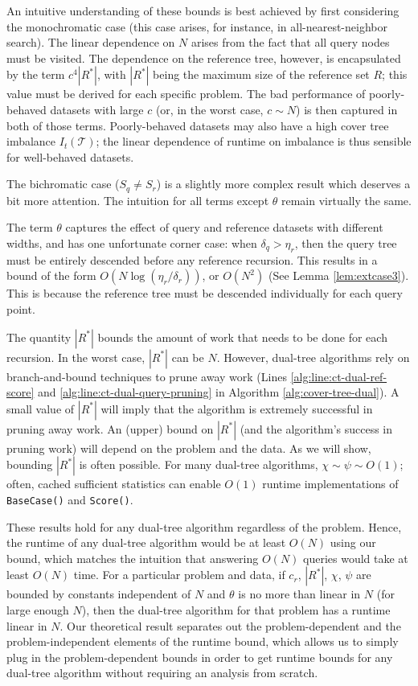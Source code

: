 An intuitive understanding of these bounds is best achieved by first considering
the monochromatic case (this case arises, for instance, in all-nearest-neighbor
search).  The linear dependence on $N$ arises from the fact that all query nodes
must be visited.  The dependence on the reference tree, however, is encapsulated
by the term $c^4 |R^*|$, with $|R^*|$ being the maximum size of the reference
set $R$; this value must be derived for each specific problem.  The bad
performance of poorly-behaved datasets with large $c$ (or, in the worst case, $c
\sim N$) is then captured in both of those terms.  Poorly-behaved datasets may
also have a high cover tree imbalance $I_t(\mathscr{T})$; the linear dependence of
runtime on imbalance is thus sensible for well-behaved datasets.

The bichromatic case ($S_q \ne S_r$) is a slightly more complex result which
deserves a bit more attention.  The intuition for all terms except $\theta$
remain virtually the same.

The term $\theta$ captures the effect of query and reference datasets with
different widths, and has one unfortunate corner case: when $\delta_q > \eta_r$,
then the query tree must be entirely descended before any reference recursion.
This results in a bound of the form $O(N \log (\eta_r / \delta_r))$, or
$O(N^2)$ (See Lemma \ref{lem:extcase3}).  This is because the reference tree
must be descended individually for each query point.

The quantity $|R^*|$ bounds the amount of work that needs to be done for each
recursion. In the worst case, $|R^*|$ can be $N$. However,
dual-tree algorithms rely on branch-and-bound techniques to prune away
work (Lines \ref{alg:line:ct-dual-ref-score} and
\ref{alg:line:ct-dual-query-pruning} in Algorithm \ref{alg:cover-tree-dual}). A
small value of $|R^*|$ will imply that the algorithm is extremely successful in
pruning away work.  An (upper) bound on $|R^*|$ (and the algorithm's
success in pruning work) will depend on the problem and the data.  As we will
show, bounding $|R^*|$ is often possible. %
For many dual-tree algorithms, $\chi \sim \psi \sim O(1)$; often, cached
sufficient statistics \citep{moore2000anchors} can enable $O(1)$ runtime
implementations of \texttt{BaseCase()} and \texttt{Score()}.

These results hold for any dual-tree algorithm regardless of the problem. Hence,
the runtime of any dual-tree algorithm
would be at least $O(N)$ using our bound, which matches the intuition that
answering $O(N)$ queries would take at least $O(N)$ time. For a particular
problem and data, if $c_r$, $|R^*|$, $\chi$, $\psi$ are bounded by constants
independent of $N$ and $\theta$ is no more than linear in $N$ (for large enough
$N$), then the dual-tree algorithm for that problem has a runtime linear in $N$.
Our theoretical result separates out the problem-dependent and the
problem-independent elements of the runtime bound, which allows us to simply
plug in the problem-dependent bounds in order to get runtime bounds for any
dual-tree algorithm without requiring an analysis from scratch.

